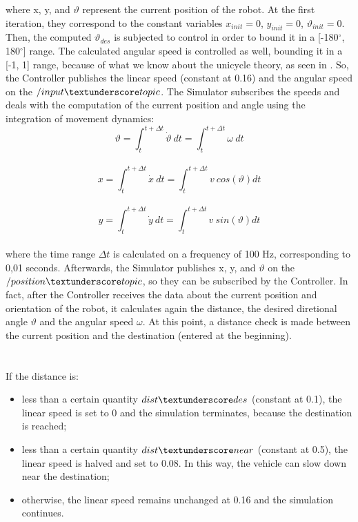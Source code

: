\documentclass[a4paper,11pt,oneside]{book}
\begin{document}
where x, y, and $\vartheta$ represent the current position of the robot. At the first iteration, they correspond to the constant variables $x_{init}  = 0$, $y_{init}  = 0$, $\vartheta_{init}  = 0$. Then, the computed $\vartheta_{des}$ is subjected to control in order to bound it in a [-180$^{\circ}$, 180$^{\circ}$] range. The calculated angular speed is controlled as well, bounding it in a [-1, 1] range, because of what we know about the unicycle theory, as seen in \cite{MR-GB:55}. So, the Controller publishes the linear speed (constant at 0.16) and the angular speed on the $/input\textunderscore topic$. The Simulator subscribes the speeds and deals with the computation of the current position and angle using the integration of movement dynamics:
$$\vartheta = \int_{t}^{t+\Delta t} \dot{\vartheta} \> dt = \int_{t}^{t+\Delta t} \omega \> dt $$\\
$$x = \int_{t}^{t+\Delta t} \dot{x} \> dt = \int_{t}^{t+\Delta t} v \> cos(\vartheta) dt $$\\
$$y = \int_{t}^{t+\Delta t} \dot{y} \> dt = \int_{t}^{t+\Delta t} v \> sin(\vartheta) dt $$\\

where the time range $\Delta t$ is calculated on a frequency of 100 Hz, corresponding to 0,01 seconds. Afterwards, the Simulator publishes x, y, and $\vartheta$ on the $/position\textunderscore topic$, so they can be subscribed by the Controller. In fact, after the Controller receives the data about the current position and orientation of the robot, it calculates again the distance, the desired diretional angle $\vartheta$ and the angular speed $\omega$. At this point, a distance check is made between the current position and the destination (entered at the beginning).\\
\\
\\If the distance is:
\begin{itemize}
\item less than a certain quantity $dist\textunderscore des$ (constant at 0.1), the linear speed is set to 0 and the simulation terminates, because the destination is reached;
\item less than a certain quantity $dist\textunderscore near$ (constant at 0.5), the linear speed is halved and set to 0.08. In this way, the vehicle can slow down near the destination;
\item otherwise, the linear speed remains unchanged at 0.16 and the simulation continues.
\end{itemize}
\end{document}
